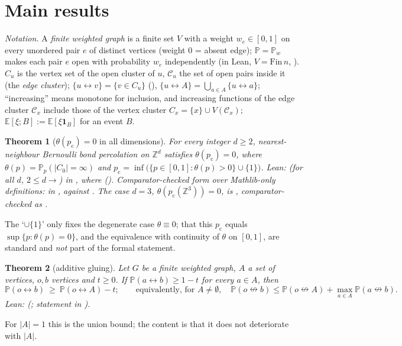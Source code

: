 \documentclass[11pt]{article}
\newtheorem{theorem}{Theorem}[section]
\theoremstyle{definition}
\theoremstyle{remark}
\newcommand{\PP}{\mathbb{P}}
\newcommand{\E}{\mathbb{E}}
\newcommand{\Zd}{\mathbb{Z}^d}
\newcommand{\ZZ}{\mathbb{Z}}
\newcommand{\pc}{p_{\mathrm c}}
\newcommand{\con}{\leftrightarrow}
\newcommand{\ncon}{\nleftrightarrow}
\newcommand{\one}{\mathbf 1}
\newcommand{\eC}{\mathcal{C}}
\begin{document}
\section{Main results}\label{s:results}

\emph{Notation.}  A \emph{finite weighted graph} is a finite set $V$ with a weight $w_e\in[0,1]$ on every unordered pair $e$ of distinct
vertices (weight $0$ = absent edge); $\PP=\PP_w$ makes each pair $e$ open with probability $w_e$ independently (in Lean, $V=\mathrm{Fin}\,n$,
).  $C_u$ is the vertex set of the open cluster of $u$, $\eC_u$ the set of open pairs inside it (the \emph{edge
cluster}); $\{u\con v\}=\{v\in C_u\}$ (), $\{u\con A\}=\bigcup_{a\in A}\{u\con a\}$; ``increasing'' means monotone for
inclusion, and increasing functions of the edge cluster $\eC_x$ include those of the vertex cluster $C_x=\{x\}\cup V(\eC_x)$;
$\E[\xi;B]:=\E[\xi\one_B]$ for an event $B$.

\begin{theorem}[$\theta(\pc)=0$ in all dimensions]\label{thm:main}
For every integer $d\ge2$, nearest-neighbour Bernoulli bond percolation on $\Zd$ satisfies $\theta(\pc)=0$, where
$\theta(p)=\PP_p(|C_0|=\infty)$ and $\pc=\inf\bigl(\{p\in[0,1]:\theta(p)>0\}\cup\{1\}\bigr)$.
\emph{Lean:}  (for all $d$, $2\le d\to{}$)
in , where 
().  Comparator-checked form over Mathlib-only definitions:
 in , against .  The case $d=3$, $\theta(\pc(\ZZ^3))=0$, is
, comparator-checked as .\label{cor:Z3}
\end{theorem}
The `$\cup\{1\}$' only fixes the degenerate case $\theta\equiv0$; that this $\pc$ equals $\sup\{p:\theta(p)=0\}$, and the equivalence with
continuity of $\theta$ on $[0,1]$, are standard and \emph{not} part of the formal statement.

\begin{theorem}[additive gluing]\label{thm:AG}
Let $G$ be a finite weighted graph, $A$ a set of vertices, $o,b$ vertices and $t\ge0$.  If $\PP(a\con b)\ge1-t$ for every $a\in A$, then
\begin{equation}\label{eq:AG}
 \PP(o\con b)\ \ge\ \PP(o\con A)-t;\qquad\text{equivalently, for }A\neq\emptyset,\quad
 \PP(o\ncon b)\le\PP(o\ncon A)+\max_{a\in A}\PP(a\ncon b).
\end{equation}
\emph{Lean:}  (; statement in
).
\end{theorem}
For $|A|=1$ this is the union bound; the content is that it does not deteriorate with $|A|$.
\end{document}
